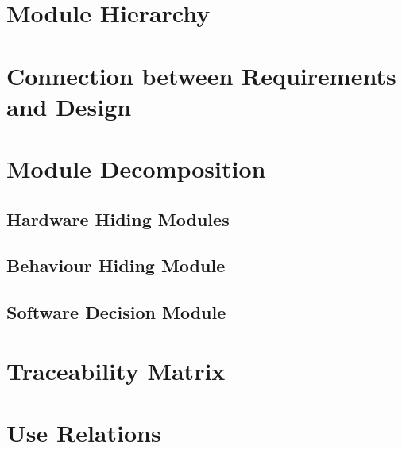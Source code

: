\documentclass{article}
\begin{document}
\section{Module Hierarchy}

\section{Connection between Requirements and Design}

\section{Module Decomposition}
\subsection{Hardware Hiding Modules}
\subsection{Behaviour Hiding Module}
\subsection{Software Decision Module}

\section{Traceability Matrix}

\section{Use Relations}

\newpage
\listoftables
\listoffigures
\end{document}
